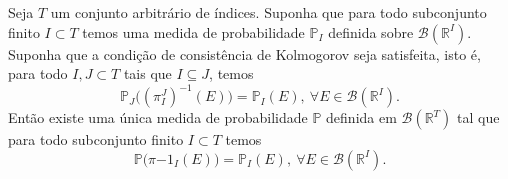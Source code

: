 \begin{teorema}
\label{teo-exist-kolmogorov-nao-enumeravel}
Seja $T$ um conjunto arbitrário de índices. 
Suponha que para todo subconjunto finito $I\subset T$
temos uma medida de probabilidade $\mathbb{P}_{I}$
definida sobre $\mathscr{B}(\mathbb{R}^I)$.
Suponha que a condição de consistência de Kolmogorov 
seja satisfeita, isto é, para todo $I,J\subset T$ 
tais que $I\subseteq J$, temos
\[
\mathbb{P}_{J}\big( (\pi^{J}_{I})^{-1}(E) \big)
=
\mathbb{P}_{I}(E),
\ \forall E\in\mathscr{B}(\mathbb{R}^{I}).
\]
Então existe uma única medida de probabilidade 
$\mathbb{P}$ definida em $\mathscr{B}(\mathbb{R}^T)$ 
tal que para todo subconjunto finito $I\subset T$ temos
\[
\mathbb{P}\big(\pi{-1}_{I}(E) ) = \mathbb{P}_{I}(E),
\ \forall E\in\mathscr{B}(\mathbb{R}^{I}).
\]
\end{teorema}


